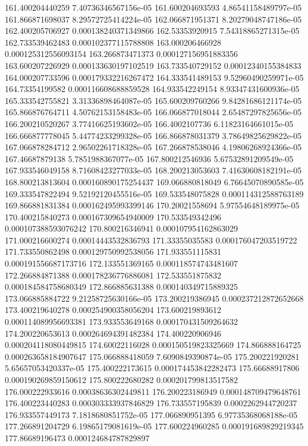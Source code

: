 {161.400204440259 7.40736346567156e-05
161.600204693593 4.86541158489797e-05
161.866871698037 8.29572725414224e-05
162.066871951371 8.20279048747186e-05
162.400205706927 0.000138240371349866
162.53353920915 7.54318865271315e-05
162.733539462483 0.000102377115788808
163.000206466928 0.000125312556093154
163.266873471373 0.000127156951883356
163.600207226929 0.000133630197102519
163.733540729152 0.00012340155384833
164.000207733596 0.000179332216267472
164.333541489153 9.52960490259971e-05
164.73354199582 0.000116608688859528
164.933542249154 8.93347431600936e-05
165.333542755821 3.31336898464087e-05
165.600209760266 9.84281686121174e-05
165.866876764711 4.50762153158483e-05
166.066877018044 2.65487297825656e-05
166.200210520267 3.77416625193602e-05
166.4002107736 6.11823164661015e-05
166.666877778045 5.44774233299328e-05
166.866878031379 3.78649825629822e-05
167.066878284712 2.96502261718328e-05
167.266878538046 4.19806268924366e-05
167.46687879138 5.7851988367077e-05
167.800212546936 5.67532891209549e-05
167.933546049158 8.71608423277033e-05
168.200213053603 7.41630608182191e-05
168.800213813604 0.000160890175254437
169.066880818049 6.76645070890585e-05
169.333547822494 9.52192120455516e-05
169.533548075828 0.000114312588763189
169.866881831384 0.000162495993399146
170.20021558694 5.97554648189975e-05
170.400215840273 0.000167309654940009
170.533549342496 0.000107388593076242
170.800216346941 0.000107954162863029
171.000216600274 0.00014443532836793
171.33355035583 0.000176047203519722
171.733550862498 0.000129750992538056
171.933551115831 0.000191556687173716
172.133551369165 0.000118574743481607
172.266884871388 0.000178236776886081
172.533551875832 0.000184584758680349
172.866885631388 0.000140349715889325
173.066885884722 9.21258725630166e-05
173.200219386945 0.000237212872652668
173.400219640278 0.000254900358056204
173.600219893612 0.000114089956693381
173.933553649168 0.000170431509264632
174.200220653613 0.000264694391482384
174.400220906946 0.000204118080449815
174.60022116028 0.000150519823325669
174.866888164725 0.000263658184907647
175.066888418059 7.6090849390874e-05
175.200221920281 5.65657053420337e-05
175.400222173615 0.000174453842282473
175.66688917806 0.000190269859150612
175.800222680282 0.000201799813517582
176.000222933616 0.00038636302449811
176.200223186949 0.000148709479648761
176.400223440283 0.000303333937846829
176.733557195839 0.0002262944720237
176.933557449173 7.1818680851752e-05
177.066890951395 6.97735368068188e-05
177.266891204729 6.19865179081619e-05
177.600224960285 0.000191689829219345
177.86689196473 0.000124684787829897
}
